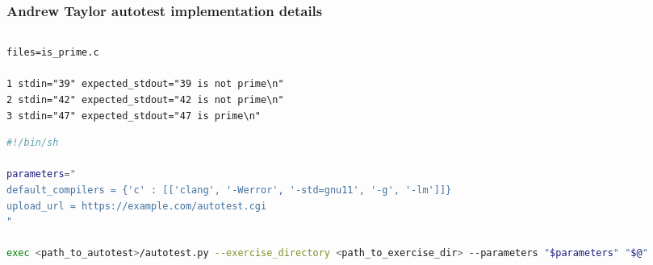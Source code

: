 \documentclass[xcolor]{beamer}
\begin{document}
\begin{frame}[fragile]
	\frametitle{Andrew Taylor autotest implementation details}
	\begin{columns}
		\begin{column}{0.55\textwidth}
			\centering
\begin{lstlisting}[caption={autotest Example Test Cases}]
files=is_prime.c

1 stdin="39" expected_stdout="39 is not prime\n"
2 stdin="42" expected_stdout="42 is not prime\n"
3 stdin="47" expected_stdout="47 is prime\n"
\end{lstlisting}
\begin{lstlisting}[language=bash, breaklines=true, caption={autotest Wrapper}]
#!/bin/sh

parameters="
default_compilers = {'c' : [['clang', '-Werror', '-std=gnu11', '-g', '-lm']]}
upload_url = https://example.com/autotest.cgi
"

exec <path_to_autotest>/autotest.py --exercise_directory <path_to_exercise_dir> --parameters "$parameters" "$@"
\end{lstlisting}
		\end{column}
		\begin{column}{0.35\textwidth}
			\centering
		\end{column}
	\end{columns}
\end{frame}
\end{document}
